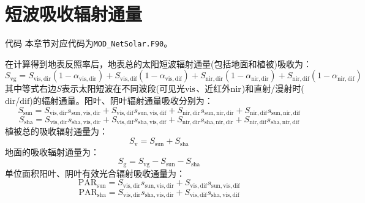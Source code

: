 \section{短波吸收辐射通量}\label{短波吸收辐射通量}
\begin{mymdframed}{代码}
  本章节对应代码为\texttt{MOD\_NetSolar.F90}。
\end{mymdframed}

在计算得到地表反照率后，地表总的太阳短波辐射通量(包括地面和植被)吸收为：
\begin{equation}
  S_{\mathrm{v g}}=S_{\mathrm{vis,dir}}\left(1-\alpha_{\mathrm{vis,dir}}\right)+S_{\mathrm{vis,dif}}\left(1-\alpha_{\mathrm{vis,dif}}\right)+
  S_{\mathrm{nir,dir}}\left(1-\alpha_{\mathrm{nir,dir}}\right)+S_{\mathrm{nir,dif}}\left(1-\alpha_{\mathrm{nir,dif}}\right)
\end{equation}
其中等式右边$S$表示太阳短波在不同波段(可见光$\rm vis$、近红外$\rm nir$)和直射/漫射时(${\mathrm {dir}}$/${\mathrm {dif}}$)的辐射通量。阳叶、阴叶辐射通量吸收分别为：
\begin{equation}
  S_{\mathrm{sun}}=S_{\mathrm{vis, dir}} s_{\mathrm{sun, vis, dir}}+S_{\mathrm{vis, dif}} s_{\mathrm{sun, vis, dif}}+S_{\mathrm{nir, dir}} s_{\mathrm{sun, nir, dir}}+S_{\mathrm{nir, dif}} s_{\mathrm{sun, nir, dif}}
\end{equation}
\begin{equation}
  S_{\mathrm{sha}}=S_{\mathrm{vis, dir}} s_{\mathrm{sha,vis,dir}}+S_{\mathrm{vis, dif}} s_{\mathrm{sha,vis,dif}}+S_{\mathrm{nir, dir}} s_{\mathrm{sha,nir,dir}}+S_{\mathrm{nir, dif}} s_{\mathrm{sha,nir,dif}}
\end{equation}
植被总的吸收辐射通量为：
\begin{equation}
  S_{\mathrm{v}}=S_{\mathrm{s u n}}+S_{\mathrm{s h a}}
\end{equation}
地面的吸收辐射通量为：
\begin{equation}\label{eq:sg}
  S_{\mathrm{g}}=S_{\mathrm{v g}}-S_{\mathrm{s u n}}-S_{\mathrm{s h a}}
\end{equation}
单位面积阳叶、阴叶有效光合辐射吸收通量为：
\begin{equation}
  \text{PAR}_{\mathrm{sun}} =S_{\mathrm{vis, dir}} s_{\mathrm{sun, vis, dir}}+S_{\mathrm{vis, dif}} s_{\mathrm{sun, vis, dif}}
\end{equation}
\begin{equation}
  \text{PAR}_{\mathrm{sha}} =S_{\mathrm{vis, dir}} s_{\mathrm{sha, vis, dir}}+S_{\mathrm{vis, dif}} s_{\mathrm{sha, vis, dif}}
\end{equation}


